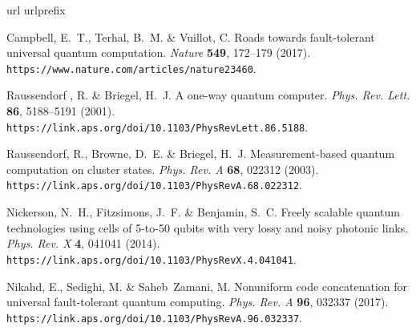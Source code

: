 \documentclass[
onecolumn,
superscriptaddress
]{revtex4-1}
\begin{document}
\providecommand{\noopsort}[1]{}\providecommand{\singleletter}[1]{#1}
\begin{thebibliography}{100}
\expandafter\ifx\csname url\endcsname\relax
  \def\url#1{\texttt{#1}}\fi
\expandafter\ifx\csname urlprefix\endcsname\relax\def\urlprefix{}\fi
\providecommand{\bibinfo}[2]{#2}
\providecommand{\eprint}[2][]{\url{#2}}

\bibinfo{author}{Campbell, E.~T.}, \bibinfo{author}{Terhal, B.~M.} \&
  \bibinfo{author}{Vuillot, C.}
\newblock \bibinfo{title}{Roads towards fault-tolerant universal quantum
  computation}.
\newblock \emph{\bibinfo{journal}{Nature}} \textbf{\bibinfo{volume}{549}},
  \bibinfo{pages}{172--179} (\bibinfo{year}{2017}).
\newblock \urlprefix\url{https://www.nature.com/articles/nature23460}.

\bibinfo{author}{Raussendorf{ }, R.} \& \bibinfo{author}{Briegel, H.~J.}
\newblock \bibinfo{title}{A one-way quantum computer}.
\newblock \emph{\bibinfo{journal}{Phys. Rev. Lett.}}
  \textbf{\bibinfo{volume}{86}}, \bibinfo{pages}{5188--5191}
  (\bibinfo{year}{2001}).
\newblock \urlprefix\url{https://link.aps.org/doi/10.1103/PhysRevLett.86.5188}.

\bibinfo{author}{Raussendorf, R.}, \bibinfo{author}{Browne, D.~E.} \&
  \bibinfo{author}{Briegel, H.~J.}
\newblock \bibinfo{title}{Measurement-based quantum computation on cluster
  states}.
\newblock \emph{\bibinfo{journal}{Phys. Rev. A}} \textbf{\bibinfo{volume}{68}},
  \bibinfo{pages}{022312} (\bibinfo{year}{2003}).
\newblock \urlprefix\url{https://link.aps.org/doi/10.1103/PhysRevA.68.022312}.

\bibinfo{author}{Nickerson, N.~H.}, \bibinfo{author}{Fitzsimons, J.~F.} \&
  \bibinfo{author}{Benjamin, S.~C.}
\newblock \bibinfo{title}{Freely scalable quantum technologies using cells of
  5-to-50 qubits with very lossy and noisy photonic links}.
\newblock \emph{\bibinfo{journal}{Phys. Rev. X}} \textbf{\bibinfo{volume}{4}},
  \bibinfo{pages}{041041} (\bibinfo{year}{2014}).
\newblock \urlprefix\url{https://link.aps.org/doi/10.1103/PhysRevX.4.041041}.

\bibinfo{author}{Nikahd, E.}, \bibinfo{author}{Sedighi, M.} \&
  \bibinfo{author}{Saheb~Zamani, M.}
\newblock \bibinfo{title}{Nonuniform code concatenation for universal
  fault-tolerant quantum computing}.
\newblock \emph{\bibinfo{journal}{Phys. Rev. A}} \textbf{\bibinfo{volume}{96}},
  \bibinfo{pages}{032337} (\bibinfo{year}{2017}).
\newblock \urlprefix\url{https://link.aps.org/doi/10.1103/PhysRevA.96.032337}.


\end{thebibliography}
\end{document}
